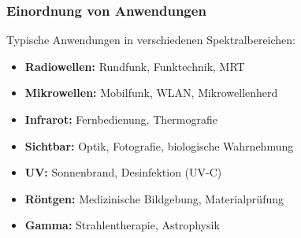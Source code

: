 \begin{table}[H]
	\centering
	\scriptsize
	\caption{Typische Bereiche des elektromagnetischen Spektrums mit Frequenz, Wellenlänge und Energie}
	\label{tab:spektrum}
\end{table}


\subsubsection{Einordnung von Anwendungen}

Typische Anwendungen in verschiedenen Spektralbereichen:

\begin{itemize}
	\item \textbf{Radiowellen:} Rundfunk, Funktechnik, MRT
	\item \textbf{Mikrowellen:} Mobilfunk, WLAN, Mikrowellenherd
	\item \textbf{Infrarot:} Fernbedienung, Thermografie
	\item \textbf{Sichtbar:} Optik, Fotografie, biologische Wahrnehmung
	\item \textbf{UV:} Sonnenbrand, Desinfektion (UV-C)
	\item \textbf{Röntgen:} Medizinische Bildgebung, Materialprüfung
	\item \textbf{Gamma:} Strahlentherapie, Astrophysik
\end{itemize}

